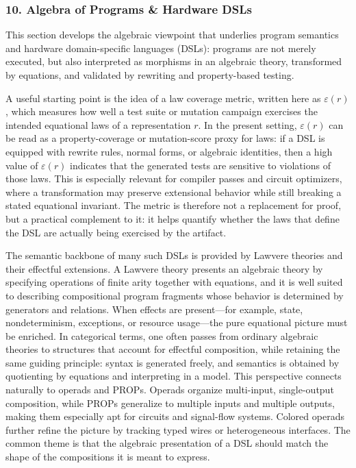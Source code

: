 \documentclass[11pt]{article}
\begin{document}

\subsubsection{10. Algebra of Programs \& Hardware DSLs}


This section develops the algebraic viewpoint that underlies program semantics and hardware domain-specific languages (DSLs): programs are not merely executed, but also interpreted as morphisms in an algebraic theory, transformed by equations, and validated by rewriting and property-based testing.

A useful starting point is the idea of a law coverage metric, written here as \(\varepsilon(r)\), which measures how well a test suite or mutation campaign exercises the intended equational laws of a representation \(r\). In the present setting, \(\varepsilon(r)\) can be read as a property-coverage or mutation-score proxy for laws: if a DSL is equipped with rewrite rules, normal forms, or algebraic identities, then a high value of \(\varepsilon(r)\) indicates that the generated tests are sensitive to violations of those laws. This is especially relevant for compiler passes and circuit optimizers, where a transformation may preserve extensional behavior while still breaking a stated equational invariant. The metric is therefore not a replacement for proof, but a practical complement to it: it helps quantify whether the laws that define the DSL are actually being exercised by the artifact.

The semantic backbone of many such DSLs is provided by Lawvere theories and their effectful extensions. A Lawvere theory presents an algebraic theory by specifying operations of finite arity together with equations, and it is well suited to describing compositional program fragments whose behavior is determined by generators and relations. When effects are present---for example, state, nondeterminism, exceptions, or resource usage---the pure equational picture must be enriched. In categorical terms, one often passes from ordinary algebraic theories to structures that account for effectful composition, while retaining the same guiding principle: syntax is generated freely, and semantics is obtained by quotienting by equations and interpreting in a model. This perspective connects naturally to operads and PROPs. Operads organize multi-input, single-output composition, while PROPs generalize to multiple inputs and multiple outputs, making them especially apt for circuits and signal-flow systems. Colored operads further refine the picture by tracking typed wires or heterogeneous interfaces. The common theme is that the algebraic presentation of a DSL should match the shape of the compositions it is meant to express.
\end{document}
